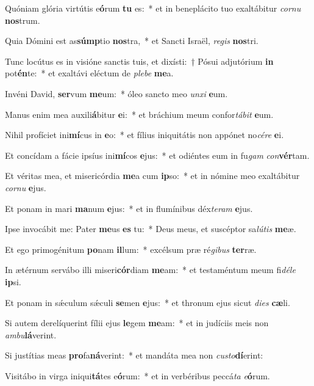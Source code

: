 \item Quóniam glória virtútis e\textbf{ó}rum \textbf{tu} es:~* et in beneplácito tuo exaltábitur \textit{cor}\textit{nu} \textbf{nos}trum.
\item Quia Dómini est as\textbf{súmp}tio \textbf{nos}tra,~* et Sancti Israël, \textit{re}\textit{gis} \textbf{nos}tri.
\item Tunc locútus es in visióne sanctis tuis, et dixísti:~† Pósui adjutórium \textbf{in} pot\textbf{én}te:~* et exaltávi eléctum de \textit{ple}\textit{be} \textbf{me}a.
\item Invéni David, \textbf{ser}vum \textbf{me}um:~* óleo sancto meo \textit{un}\textit{xi} \textbf{e}um.
\item Manus enim mea auxili\textbf{á}bitur \textbf{e}i:~* et bráchium meum confor\textit{tá}\textit{bit} \textbf{e}um.
\item Nihil profíciet ini\textbf{mí}cus in \textbf{e}o:~* et fílius iniquitátis non appónet no\textit{cé}\textit{re} \textbf{e}i.
\item Et concídam a fácie ipsíus ini\textbf{mí}cos \textbf{e}jus:~* et odiéntes eum in fu\textit{gam} \textit{con}\textbf{vér}tam.
\item Et véritas mea, et misericórdia \textbf{me}a cum \textbf{ip}so:~* et in nómine meo exaltábitur \textit{cor}\textit{nu} \textbf{e}jus.
\item Et ponam in mari \textbf{ma}num \textbf{e}jus:~* et in flumínibus déx\textit{te}\textit{ram} \textbf{e}jus.
\item Ipse invocábit me: Pater \textbf{me}us \textbf{es} tu:~* Deus meus, et suscéptor sa\textit{lú}\textit{tis} \textbf{me}æ.
\item Et ego primogénitum \textbf{po}nam \textbf{il}lum:~* excélsum præ ré\textit{gi}\textit{bus} \textbf{ter}ræ.
\item In ætérnum servábo illi miseri\textbf{cór}diam \textbf{me}am:~* et testaméntum meum fi\textit{dé}\textit{le} \textbf{ip}si.
\item Et ponam in sǽculum sǽculi \textbf{se}men \textbf{e}jus:~* et thronum ejus sicut \textit{di}\textit{es} \textbf{cæ}li.
\item Si autem derelíquerint fílii ejus \textbf{le}gem \textbf{me}am:~* et in judíciis meis non \textit{am}\textit{bu}\textbf{lá}verint.
\item Si justítias meas \textbf{pro}fa\textbf{ná}verint:~* et mandáta mea non \textit{cus}\textit{to}\textbf{dí}erint:
\item Visitábo in virga iniqui\textbf{tá}tes e\textbf{ó}rum:~* et in verbéribus peccá\textit{ta} \textit{e}\textbf{ó}rum.
